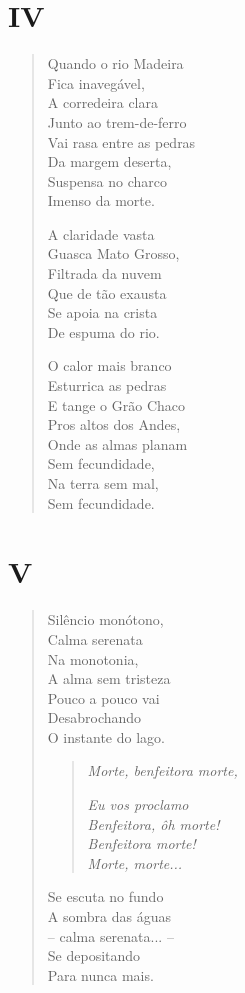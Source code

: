 \pagebreak
\section{IV}

\begin{verse}
Quando o rio Madeira\\
Fica inavegável,\\
A corredeira clara\\
Junto ao trem-de-ferro\\
Vai rasa entre as pedras\\
Da margem deserta,\\
Suspensa no charco\\
Imenso da morte.

A claridade vasta\\
Guasca Mato Grosso,\\
Filtrada da nuvem\\
Que de tão exausta\\
Se apoia na crista\\
De espuma do rio.

O calor mais branco\\
Esturrica as pedras\\
E tange o Grão Chaco\\
Pros altos dos Andes,\\
Onde as almas planam\\
Sem fecundidade,\\
Na terra sem mal,\\
Sem fecundidade.
\end{verse}

\pagebreak
\section{V}

\begin{verse}
Silêncio monótono,\\
Calma serenata\\
Na monotonia,\\
A alma sem tristeza\\
Pouco a pouco vai\\
Desabrochando\\
O instante do lago.

\begin{quote}
\forceindent\emph{Morte, benfeitora morte, }

\emph{Eu vos proclamo }\\
\emph{Benfeitora, ôh morte! }\\
\emph{Benfeitora morte! }\\
\emph{Morte, morte...}
\end{quote}

Se escuta no fundo\\
A sombra das águas\\
-- calma serenata... --\\
Se depositando\\
Para nunca mais.
\end{verse}

